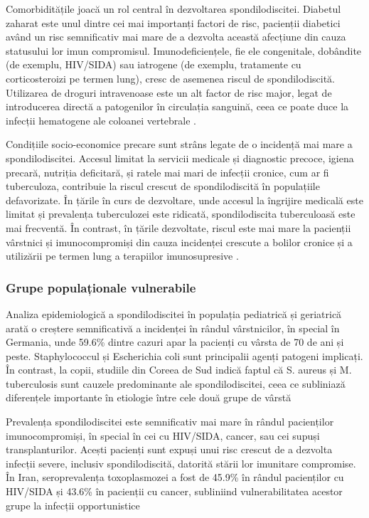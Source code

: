 \documentclass[romanian,12pt,a4paper]{article}
\begin{document}
Comorbiditățile joacă un rol central în dezvoltarea spondilodiscitei.
Diabetul zaharat este unul dintre cei mai importanți factori de risc,
pacienții diabetici având un risc semnificativ mai mare de a dezvolta
această afecțiune din cauza statusului lor imun compromisul.
Imunodeficiențele, fie ele congenitale, dobândite (de exemplu, HIV/SIDA)
sau iatrogene (de exemplu, tratamente cu corticosteroizi pe termen
lung), cresc de asemenea riscul de spondilodiscită. Utilizarea de
droguri intravenoase este un alt factor de risc major, legat de
introducerea directă a patogenilor în circulația sanguină, ceea ce poate
duce la infecții hematogene ale coloanei vertebrale
\cite{RadionuclideImagingMusculoskeletal2016}\cite{ImagingAssessmentSpine2024}.

Condițiile socio-economice precare sunt strâns legate de o incidență mai
mare a spondilodiscitei. Accesul limitat la servicii medicale și
diagnostic precoce, igiena precară, nutriția deficitară, și ratele mai
mari de infecții cronice, cum ar fi tuberculoza, contribuie la riscul
crescut de spondilodiscită în populațiile defavorizate. În țările în
curs de dezvoltare, unde accesul la îngrijire medicală este limitat și
prevalența tuberculozei este ridicată, spondilodiscita tuberculoasă este
mai frecventă. În contrast, în țările dezvoltate, riscul este mai mare
la pacienții vârstnici și imunocompromiși din cauza incidenței crescute
a bolilor cronice și a utilizării pe termen lung a terapiilor
imunosupresive \cite{RoleNuclearMedicine2012}.

\subsubsection{Grupe populaționale vulnerabile}

Analiza epidemiologică a spondilodiscitei în populația pediatrică și
geriatrică arată o creștere semnificativă a incidenței în rândul
vârstnicilor, în special în Germania, unde 59.6\% dintre cazuri apar la
pacienți cu vârsta de 70 de ani și peste. Staphylococcul și Escherichia
coli sunt principalii agenți patogeni implicați. În contrast, la copii,
studiile din Coreea de Sud indică faptul că S. aureus și M. tuberculosis
sunt cauzele predominante ale spondilodiscitei, ceea ce subliniază
diferențele importante în etiologie între cele două grupe de vârstă
\cite{EtiologyClinicalPresentation2016}

Prevalența spondilodiscitei este semnificativ mai mare în rândul
pacienților imunocompromiși, în special în cei cu HIV/SIDA, cancer, sau
cei supuși transplanturilor. Acești pacienți sunt expuși unui risc
crescut de a dezvolta infecții severe, inclusiv spondilodiscită,
datorită stării lor imunitare compromise. În Iran, seroprevalența
toxoplasmozei a fost de 45.9\% în rândul pacienților cu HIV/SIDA și
43.6\% în pacienții cu cancer, subliniind vulnerabilitatea acestor grupe
la infecții opportunistice \cite{EpidemiologySpondylodiscitisGermany2023}
\pagebreak
\end{document}
